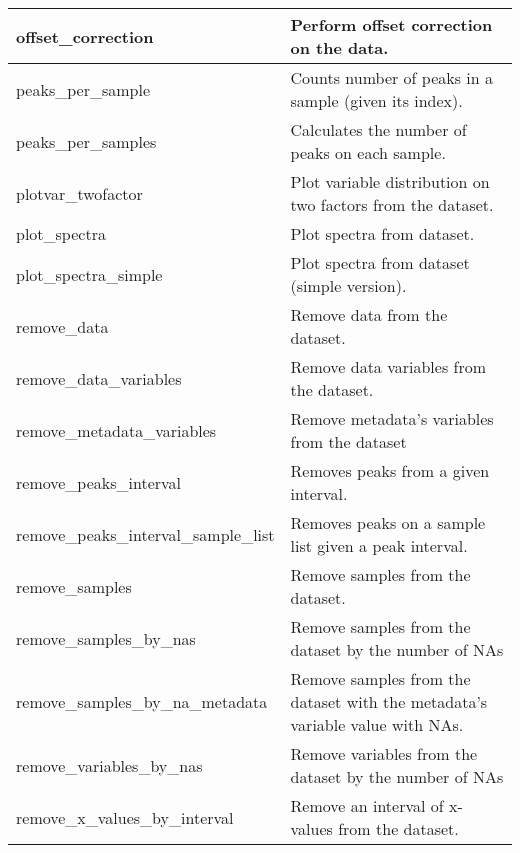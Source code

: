 \begin{scriptsize}
\begin{longtable}{|m{4.3cm}|m{11cm}|}
		\hline
		offset\_correction & Perform offset correction on the data. \\
		
		\hline
		peaks\_per\_sample & Counts number of peaks in a sample (given its index). \\
		
		\hline
		peaks\_per\_samples & Calculates the number of peaks on each sample. \\
		
		\hline
		plotvar\_twofactor & Plot variable distribution on two factors from the dataset. \\
		
		\hline
		plot\_spectra & Plot spectra from dataset. \\
		
		\hline
		plot\_spectra\_simple & Plot spectra from dataset (simple version). \\
		
		\hline
		remove\_data & Remove data from the dataset. \\
		
		\hline
		remove\_data\_variables & Remove data variables from the dataset. \\
		
		\hline
		remove\_metadata\_variables & Remove metadata's variables from the dataset \\
		
		\hline
		remove\_peaks\_interval & Removes peaks from a given interval. \\
		
		\hline
		remove\_peaks\_interval\_sample\_list & Removes peaks on a sample list given a peak interval. \\
		
		\hline
		remove\_samples & Remove samples from the dataset. \\
		
		\hline
		remove\_samples\_by\_nas & Remove samples from the dataset by the number of NAs \\
		
		\hline
		remove\_samples\_by\_na\_metadata & Remove samples from the dataset with the metadata's variable value with NAs. \\
		
		\hline
		remove\_variables\_by\_nas & Remove variables from the dataset by the number of NAs \\
		
		\hline
		remove\_x\_values\_by\_interval & Remove an interval of x-values from the dataset. \\
		

\end{longtable}
\end{scriptsize}

